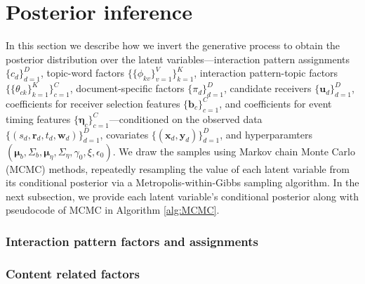 \documentclass[ba]{imsart}
\numberwithin{equation}{section}
\theoremstyle{plain}
\begin{document}
	\section{Posterior inference}\label{sec:inference}
	In this section we describe how we invert the generative process to obtain the posterior distribution over the latent variables---interaction pattern assignments $\{c_d\}_{d=1}^D$, topic-word factors $\{\{\phi_{kv}\}_{v=1}^V\}_{k=1}^K$, interaction pattern-topic factors $\{\{\theta_{ck}\}_{k=1}^K\}_{c=1}^C$, document-specific factors $\{\pi_{d}\}_{d=1}^D$, candidate receivers $\{\boldsymbol{u}_d\}_{d=1}^D$, coefficients for receiver selection features $\{\boldsymbol{b}_c\}_{c=1}^C$, and coefficients for event timing features $\{\boldsymbol{\eta}_c\}_{c=1}^C$---conditioned on the observed data $\{(s_d, \boldsymbol{r}_d, t_d, \boldsymbol{w}_d)\}_{d=1}^D$, covariates $\{(\boldsymbol{x}_d, \boldsymbol{y}_d)\}_{d=1}^D$, and hyperparamters $(\boldsymbol{\mu}_b, \Sigma_b, \boldsymbol{\mu}_\eta, \Sigma_\eta, \gamma_0, \xi, \epsilon_0)$. We draw the samples using Markov chain Monte Carlo (MCMC) methods, repeatedly resampling the value of each latent variable from its conditional posterior via a Metropolis-within-Gibbs sampling algorithm. In the next subsection, we provide each latent variable's conditional posterior along with pseudocode of MCMC in Algorithm \ref{alg:MCMC}.
		\subsubsection{Interaction pattern factors and assignments}
				\subsubsection{Content related factors}
\end{document}
